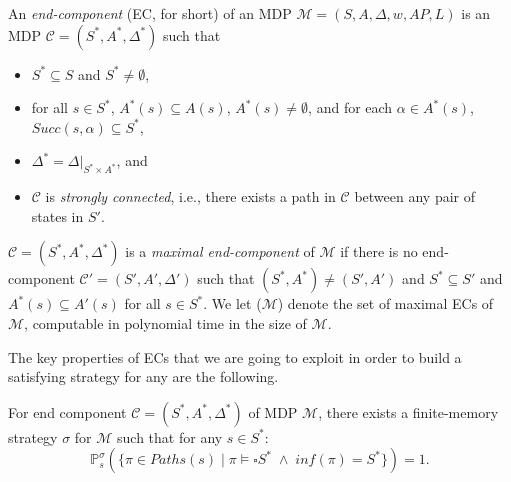 
\begin{definition}
  An \textit{end-component} (EC, for short) of an MDP $\mathcal{M} = (S, A, \Delta, w, AP, L)$ is an MDP $\mathcal{C}=(S^*, A^*, \Delta^*)$ such that
  \begin{itemize}
    \item $S^* \subseteq S$ and $S^* \neq \emptyset$,
    \item for all $s \in S^*$, $A^*(s) \subseteq A(s)$, $A^*(s) \neq \emptyset$, and
      for each $\alpha \in A^*(s)$,
      $Succ(s, \alpha) \subseteq S^*$,
    \item $\Delta^* = \Delta |_{S^* \times A^*}$, and
    \item $\mathcal{C}$ is \textit{strongly connected}, i.e., there exists a path in $\mathcal{C}$ between any pair of states in $S'$.
  \end{itemize}
\end{definition}

\begin{definition}
$\mathcal{C}=(S^*, A^*, \Delta^*)$ is a \textit{maximal end-component} of $\mathcal{M}$ if there is no end-component
$\mathcal{C}'=(S', A', \Delta')$ such that $(S^*, A^*) \neq (S', A')$ and $S^* \subseteq S'$ and $A^*(s) \subseteq A'(s)$ for all $s \in S^*$.
We let \MEC{}($\mathcal{M}$) denote the set of maximal ECs of $\mathcal{M}$, computable in polynomial time in the size of $\mathcal{M}$.
\end{definition}
The key properties of ECs that we are going to exploit in order to build a satisfying strategy for any \MOSR{} are the following.
\begin{lemma}
  For end component $\mathcal{C}=(S^*, A^*, \Delta^*)$ of MDP $\mathcal{M}$, there exists a finite-memory strategy $\sigma$ for $\mathcal{M}$
  such that for any $s \in S^*$:
  \[
    \mathbb{P}^{\sigma}_s(\{ \pi \in Paths(s) \; | \; \pi \models \square S^* \; \wedge \; inf(\pi) = S^* \}) = 1.
  \]
\end{lemma}


